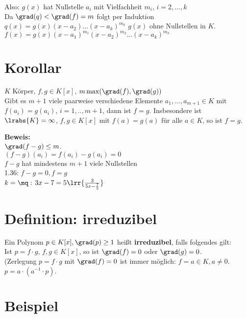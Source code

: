 	Also: $g(x)$ hat Nullstelle $a_i$ mit Vielfachheit $m_i$, $i=2,...,k$\\
	Da $\grad(q)<\grad(f)=m$ folgt per Induktion $q(x)=g(x)(x-a_2)\dots(x-a_k)^{m_k}$ $g(x)$ ohne Nullstellen in $K$.\\
	$f(x)=g(x)(x-a_1)^{m_1}(x-a_2)^{m_2}\dots(x-a_k)^{m_k}$

	\section{Korollar}

	$K$ Körper, $f,g\in K[x]$, $m\max(\grad(f),\grad(g))$\\
	Gibt es $m+1$ viele paarweise verschiedene Elemente $a_1,...,a_{m+1}\in K$ mit $f(a_i)=g(a_i)$, $i=1,..,m+1$, dann ist $f=g$. Insbesondere ist $\lrabs{K}=\infty$, $f,g\in K[x]$ mit $f(a)=g(a)$ für alle $a\in K$, so ist $f=g$.

	\textbf{Beweis:}\\
	$\grad(f-g)\leq m$.\\
	$(f-g)(a_i)=f(a_i)-g(a_i)=0$\\
	$f-g$ hat mindestens $m+1$ viele Nullstellen\\
	1.36: $f-g=0,f=g$\\
	$k=\mq:$ $3x-7=5\lrr{\frac{3}{5x-\frac{7}{5}}}$

	\section{Definition: irreduzibel}

	Ein Polynom $p\in K[x],\grad(p)\geq 1$ heißt \textbf{irreduzibel}, falls folgendes gilt:\\
	Ist $p=f\cdot g$, $f,g\in K[x]$, so ist $\grad(f)=0$ oder $\grad(g)=0$.\\
	(Zerlegung $p=f\cdot g$ mit $\grad(f)=0$ ist immer möglich: $f=a\in K,a\neq 0$. $p=a\cdot(a^{-1}\cdot p)$.

	\section{Beispiel}

